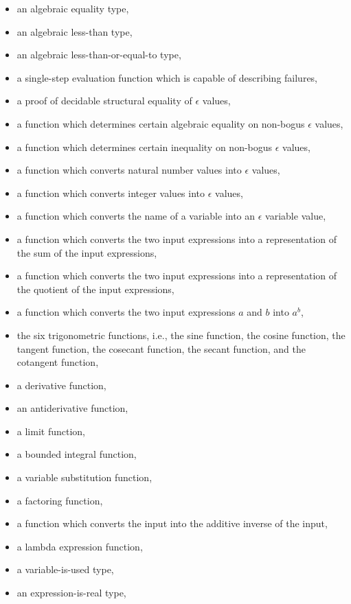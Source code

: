 \documentclass{report}
\begin{document}
\begin{itemize}
  \item an algebraic equality type,
  \item an algebraic less-than type,
  \item an algebraic less-than-or-equal-to type,
  \item a single-step evaluation function which is capable of describing failures,
  \item a proof of decidable structural equality of \(\epsilon\) values,
  \item a function which determines certain algebraic equality on non-bogus \(\epsilon\) values,
  \item a function which determines certain inequality on non-bogus \(\epsilon\) values,
  \item a function which converts natural number values into \(\epsilon\) values,
  \item a function which converts integer values into \(\epsilon\) values,
  \item a function which converts the name of a variable into an \(\epsilon\) variable value,
  \item a function which converts the two input expressions into a representation of the sum of the input expressions,
  \item a function which converts the two input expressions into a representation of the quotient of the input expressions,
  \item a function which converts the two input expressions \(a\) and \(b\) into \(a^b\),
  \item the six trigonometric functions, i.e., the sine function, the cosine function, the tangent function, the cosecant function, the secant function, and the cotangent function,
  \item a derivative function,
  \item an antiderivative function,
  \item a limit function,
  \item a bounded integral function,
  \item a variable substitution function,
  \item a factoring function,
  \item a function which converts the input into the additive inverse of the input,
  \item a lambda expression function,
  \item a variable-is-used type,
  \item an expression-is-real type,

\end{itemize}
\end{document}
